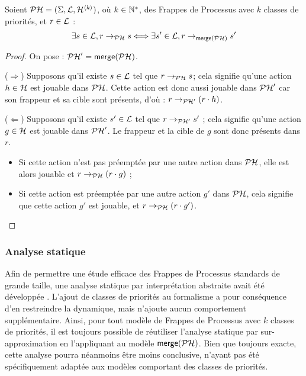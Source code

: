 \begin{theorem}
  Soient $\mathcal{PH} = (\Sigma, \mathcal{L}, \mathcal{H}^{{\langle k \rangle}})$, où $k \in \mathbb{N}^*$,
  des Frappes de Processus avec $k$ classes de priorités,
  et $r \in \mathcal{L}$ :
  \[\exists s \in \mathcal{L}, r \rightarrow_{\mathcal{PH}} s \Longleftrightarrow
    \exists s' \in \mathcal{L}, r \rightarrow_{\mathsf{merge}(\mathcal{PH})} s'\]
\end{theorem}

\begin{proof}
  On pose : $\mathcal{PH}' = \mathsf{merge}(\mathcal{PH})$.

  ($\Rightarrow$) Supposons qu'il existe $s \in \mathcal{L}$ tel que $r \rightarrow_{\mathcal{PH}} s$;
    cela signifie qu'une action $h \in \mathcal{H}$ est jouable dans $\mathcal{PH}$.
    Cette action est donc aussi jouable dans $\mathcal{PH}'$ car son frappeur et sa cible sont présents,
    d'où : $r \rightarrow_{\mathcal{PH}'} (r \cdot h)$.
    
  ($\Leftarrow$) Supposons qu'il existe $s' \in \mathcal{L}$ tel que $r \rightarrow_{\mathcal{PH}'} s'$ ;
    cela signifie qu'une action $g \in \mathcal{H}$ est jouable dans $\mathcal{PH}'$.
    Le frappeur et la cible de $g$ sont donc présents dans $r$.
    \begin{itemize}
      \item Si cette action n'est pas préemptée par une autre action dans $\mathcal{PH}$,
        elle est alors jouable et $r \rightarrow_{\mathcal{PH}} (r \cdot g)$ ;
      \item Si cette action est préemptée par une autre action $g'$ dans $\mathcal{PH}$,
        cela signifie que cette action $g'$ est jouable, et $r \rightarrow_{\mathcal{PH}} (r \cdot g')$.
    \end{itemize}
\end{proof}

\subsubsection{Analyse statique}


Afin de permettre une étude efficace des Frappes de Processus standards de grande taille,
une analyse statique par interprétation abstraite avait été développée .
L'ajout de classes de priorités au formalisme a pour conséquence d'en restreindre la dynamique,
mais n'ajoute aucun comportement supplémentaire.
Ainsi, pour tout modèle de Frappes de Processus avec $k$ classes de priorités,
il est toujours possible de réutiliser l'analyse statique par sur-approximation
en l'appliquant au modèle $\mathsf{merge}(\mathcal{PH})$.
Bien que toujours exacte, cette analyse pourra néanmoins être moins conclusive,
n'ayant pas été spécifiquement adaptée aux modèles comportant des classes de priorités.

